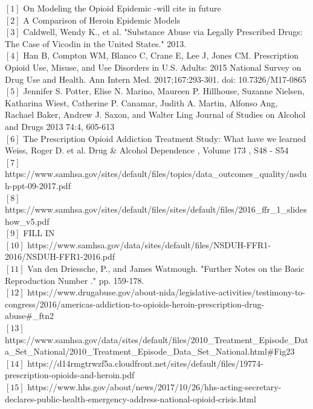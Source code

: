 \documentclass[12pt]{article}
\begin{document}
$[1]$ On Modeling the Opioid Epidemic -will cite in future \\
$[2]$ A Comparison of Heroin Epidemic Models \\
$[3]$ Caldwell, Wendy K., et al. "Substance Abuse via Legally Prescribed Drugs: The Case of Vicodin in the United States." 2013. \\
$[4]$ Han B, Compton WM, Blanco C, Crane E, Lee J, Jones CM. Prescription Opioid Use, Misuse, and Use Disorders in U.S. Adults: 2015 National Survey on Drug Use and Health. Ann Intern Med. 2017;167:293-301. doi: 10.7326/M17-0865 \\
$[5]$  Jennifer S. Potter, Elise N. Marino, Maureen P. Hillhouse, Suzanne Nielsen, Katharina Wiest, Catherine P. Canamar, Judith A. Martin, Alfonso Ang, Rachael Baker, Andrew J. Saxon, and Walter Ling
Journal of Studies on Alcohol and Drugs 2013 74:4, 605-613 \\
$[6]$ The Prescription Opioid Addiction Treatment Study: What have we learned Weiss, Roger D. et al. Drug \& Alcohol Dependence , Volume 173 , S48 - S54\\
$[7]$ https://www.samhsa.gov/sites/default/files/topics/data\_outcomes\_quality/nsduh-ppt-09-2017.pdf \\
$[8]$ https://www.samhsa.gov/sites/default/files/sites/default/files/2016\_ffr\_1\_slideshow\_v5.pdf \\ 
$[9]$ FILL IN \\
$[10]$ https://www.samhsa.gov/data/sites/default/files/NSDUH-FFR1-2016/NSDUH-FFR1-2016.pdf \\
$[11]$ Van den Driessche, P., and James Watmough. "Further Notes on the Basic Reproduction Number ." pp. 159-178. \\
$[12]$ https://www.drugabuse.gov/about-nida/legislative-activities/testimony-to-congress/2016/americas-addiction-to-opioids-heroin-prescription-drug-abuse\#\_ftn2 \\
$[13]$ https://www.samhsa.gov/data/sites/default/files/2010\_Treatment\_Episode\_Data\_Set\_National/2010\_Treatment\_Episode\_Data\_Set\_National.html\#Fig23 \\
$[14]$ https://d14rmgtrwzf5a.cloudfront.net/sites/default/files/19774-prescription-opioids-and-heroin.pdf \\
$[15]$ https://www.hhs.gov/about/news/2017/10/26/hhs-acting-secretary-declares-public-health-emergency-address-national-opioid-crisis.html \\




 
\end{document}
